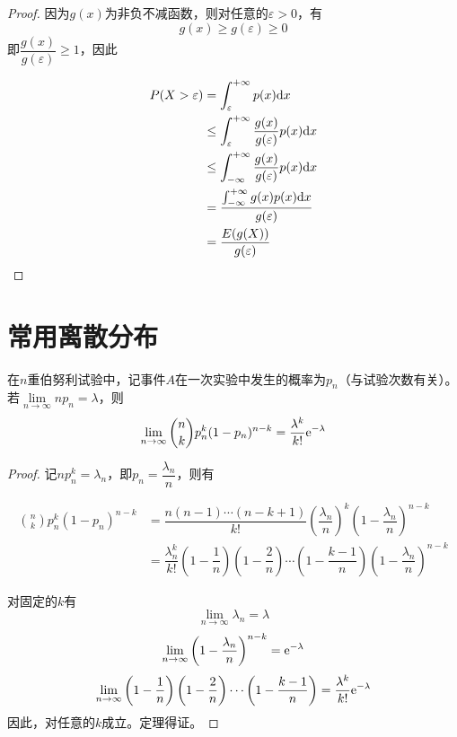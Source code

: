 \begin{proof}

    因为$g(x)$为非负不减函数，则对任意的$\varepsilon > 0$，有
    $$g(x) \geq g(\varepsilon) \geq 0$$
    即$\dfrac{g(x)}{g(\varepsilon)} \geq 1$，因此

    \begin{align*}
        P(X > \varepsilon) & = \int_{\varepsilon}^{+\infty}{p(x)}\mathrm{d} x \\
        & \leq \int_{\varepsilon}^{+\infty}{\dfrac{g(x)}{g(\varepsilon)}p(x)}\mathrm{d} x \\
        & \leq \int_{-\infty}^{+\infty}{\dfrac{g(x)}{g(\varepsilon)}p(x)}\mathrm{d} x \\
        & = \dfrac{\int_{-\infty}^{+\infty}{g(x)p(x)}\mathrm{d} x}{g(\varepsilon)} \\
        & = \dfrac{E(g(X))}{g(\varepsilon)}
    \end{align*}

\end{proof}

\section{常用离散分布}

\begin{theorem}[Poisson定理]

    在$n$重伯努利试验中，记事件$A$在一次实验中发生的概率为$p_n$（与试验次数有关）。若$\lim\limits_{n \to \infty}{n p_n} = \lambda$，则
    $$\lim\limits_{n \to \infty}{\binom{n}{k}p_n^k(1 - p_n)^{n - k}} = \dfrac{\lambda^k}{k!}\mathrm{e}^{-\lambda}$$

\end{theorem}

\begin{proof}

    记$n p_n^k = \lambda_n$，即$p_n = \dfrac{\lambda_n}{n}$，则有

    \begin{align*}
        \binom{n}{k}p_n^k(1 - p_n)^{n - k} & = \dfrac{n(n - 1) \cdots (n - k + 1)}{k!} \left( \dfrac{\lambda_n}{n}\right)^k \left( 1 - \dfrac{\lambda_n}{n} \right)^{n - k} \\
        & = \dfrac{\lambda_n^k}{k!} \left( 1 - \dfrac{1}{n} \right) \left(1 - \dfrac{2}{n} \right) \cdots \left( 1 - \dfrac{k - 1}{n} \right) \left(1 - \dfrac{\lambda_n}{n} \right)^{n - k}
    \end{align*}

    对固定的$k$有
    $$\lim\limits_{n \to \infty}{\lambda_n} = \lambda$$
    $$\lim\limits_{n \to \infty}{ \left( 1 - \dfrac{\lambda_n}{n} \right)^{n - k}} = \mathrm{e}^{-\lambda}$$
    $$\lim\limits_{n \to \infty}{ \left( 1 - \dfrac{1}{n}\right) \left( 1 - \dfrac{2}{n} \right) \cdots \left( 1 - \dfrac{k - 1}{n} \right)} = \dfrac{\lambda^k}{k!}\mathrm{e}^{-\lambda}$$
    因此，对任意的$k$成立。定理得证。

\end{proof}

